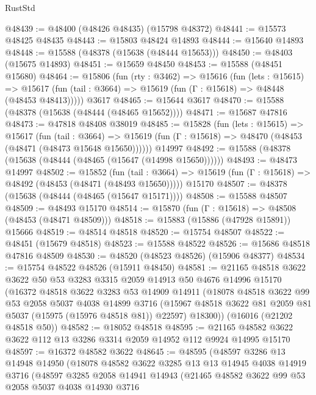 \begin{lexlean}{RustStd}
\begin{coremodule}
@48439 := @48400 (@48426 @48435) (@15798 @48372)
@48441 := @15573 @48425 @48435
@48443 := @15803 @48424 @14893
@48444 := @15640 @14893
@48448 := @15588 (@48378 (@15638 (@48444 @15653)))
@48450 := @48403 (@15675 @14893)
@48451 := @15659 @48450
@48453 := @15588 (@48451 @15680)
@48464 := @15806
    (fun (rty : @3462) =>
    @15616
      (fun (lets : @15615) =>
      @15617 (fun (tail : @3664) => @15619 (fun (Γ : @15618) => @48448 (@48453 @48413)))))
    @3617
@48465 := @15644 @3617
@48470 := @15588 (@48378 (@15638 (@48444 (@48465 @15652))))
@48471 := @15687 @47816
@48473 := @47818 @48408 @38019
@48485 := @15828
    (fun (lets : @15615) =>
    @15617
      (fun (tail : @3664) =>
      @15619 (fun (Γ : @15618) => @48470 (@48453 (@48471 (@48473 @15648 @15650))))))
    @14997
@48492 := @15588 (@48378 (@15638 (@48444 (@48465 (@15647 (@14998 @15650))))))
@48493 := @48473 @14997
@48502 := @15852
    (fun (tail : @3664) => @15619 (fun (Γ : @15618) => @48492 (@48453 (@48471 (@48493 @15650)))))
    @15170
@48507 := @48378 (@15638 (@48444 (@48465 (@15647 @15171))))
@48508 := @15588 @48507
@48509 := @48493 @15170
@48514 := @15870 (fun (Γ : @15618) => @48508 (@48453 (@48471 @48509)))
@48518 := @15883 (@15886 (@47928 @15891)) @15666
@48519 := @48514 @48518
@48520 := @15754 @48507
@48522 := @48451 (@15679 @48518)
@48523 := @15588 @48522
@48526 := @15686 @48518 @47816 @48509
@48530 := @48520 (@48523 @48526) (@15906 @48377)
@48534 := @15754 @48522 @48526 (@15911 @48450)
@48581 := @21165
    @48518
    @3622
    @3622
    @50
    @53
    @3283
    @3315
    @2059
    @14913
    @50
    @4676
    @14996
    @15170
    (@16372
      @48518
      @3622
      @3283
      @53
      @14909
      @14911
      (@18078
        @48518
        @3622
        @99
        @53
        @2058
        @5037
        @4038
        @14899
        @3716
        (@15967 @48518 @3622 @81 @2059 @81 @5037 (@15975 (@15976 @48518 @81)) @22597)
        @18300))
    (@16016 (@21202 @48518 @50))
@48582 := @18052 @48518
@48595 := @21165 @48582 @3622 @3622 @112 @13 @3286 @3314 @2059 @14952 @112 @9924 @14995 @15170
@48597 := @16372 @48582 @3622
@48645 := @48595
    (@48597
      @3286
      @13
      @14948
      @14950
      (@18078
        @48582
        @3622
        @3285
        @13
        @13
        @14945
        @4038
        @14919
        @3716
        (@48597
          @3285
          @2058
          @14941
          @14943
          (@21465
            @48582
            @3622
            @99
            @53
            @2058
            @5037
            @4038
            @14930
            @3716

\end{coremodule}
\end{lexlean}
